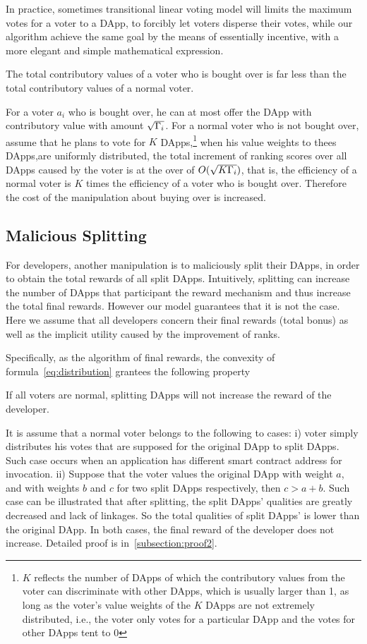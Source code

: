 In practice, sometimes transitional  linear voting model will limits the maximum votes for a voter to a DApp, to forcibly let voters disperse their votes, while our algorithm achieve the same goal by the means of essentially incentive,  with a more elegant and simple mathematical expression.

\begin{corollary}
	The total contributory values of a  voter who is bought over is far less than the total contributory values of a normal voter.
\end{corollary}
For a voter $a_i$ who is bought over, he can at most offer the DApp with contributory value with amount $\sqrt{\Gamma_i}$. For a normal voter who is not bought over, assume that he plans to vote for $K$ DApps,\footnote{$K$ reflects the number of DApps of which the contributory values from the voter can discriminate with other DApps, which is usually larger than 1, as long as the voter's value weights of the $K$ DApps are not extremely distributed, i.e., the voter only votes for a particular DApp and the votes for other DApps tent to 0} when  his value weights to thees DApps,are uniformly distributed, the total increment of ranking scores  over all DApps caused by the voter is at the over of $O(\sqrt{K\Gamma_i})$, that is, the efficiency of a normal voter is $K$ times the efficiency of a voter who is bought over. Therefore the cost of the manipulation about buying over is increased.

\subsection{Malicious Splitting}
\label{subsec:5.2}
For developers, another manipulation is to maliciously split their DApps, in order to obtain the total rewards of all split DApps. Intuitively, splitting can increase the number of DApps that participant the reward mechanism and thus increase the total final rewards. However our model guarantees that it is not the case. Here we assume that all developers concern their final rewards (total bonus) as well as the implicit utility caused by the improvement of ranks.

Specifically, as the algorithm of final rewards, the convexity of formula~\ref{eq:distribution} grantees the following property
\begin{property}
	\label{p2}
    If all voters are normal, splitting DApps will not increase the reward of the developer.
\end{property}
It is assume that a normal voter belongs to the following to cases: i) voter simply distributes his votes that are supposed for the original DApp to split DApps. Such case occurs when an application has different smart contract address for invocation. ii) Suppose that the voter values the original DApp with weight $a$, and with weights $b$ and $c$ for two split DApps respectively, then $c>a+b$. Such case can be illustrated that after splitting, the split DApps' qualities are greatly decreased and lack of linkages. So the total qualities of split DApps' is lower than the original DApp. In both cases, the final reward of the developer does not increase. Detailed proof  is in~\ref{subsection:proof2}.

